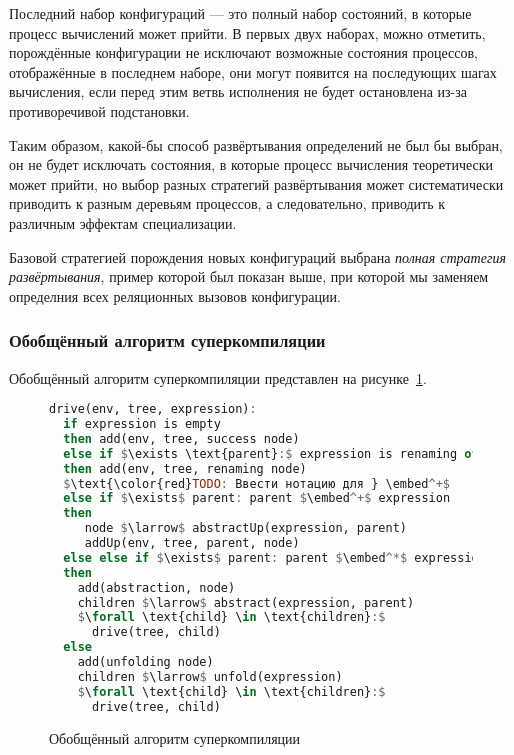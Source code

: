 Последний набор конфигураций --- это полный набор состояний, в которые процесс вычислений может
прийти. В первых двух наборах, можно отметить, порождённые конфигурации не исключают
возможные состояния процессов, отображённые в последнем наборе, они могут появится на последующих шагах вычисления,
если перед этим ветвь исполнения не будет остановлена из-за противоречивой подстановки.

Таким образом, какой-бы способ развёртывания определений не был бы выбран, он не будет
исключать состояния, в которые процесс вычисления теоретически может прийти, но выбор
разных стратегий развёртывания может систематически приводить к разным деревьям процессов,
а следовательно, приводить к различным эффектам специализации.

Базовой стратегией порождения новых конфигураций выбрана \emph{полная стратегия развёртывания},
пример которой был показан выше, при которой мы заменяем определния всех реляционных вызовов
конфигурации.


\subsubsection{Обобщённый алгоритм суперкомпиляции}

Обобщённый алгоритм суперкомпиляции представлен на рисунке~\ref{fig:scalgogen}.

\begin{figure}[h!]
\begin{lstlisting}[mathescape,language=Haskell,extendedchars=\true,frame=single,basicstyle=\ttfamily]
drive(env, tree, expression):
  if expression is empty
  then add(env, tree, success node)
  else if $\exists \text{parent}:$ expression is renaming of parent
  then add(env, tree, renaming node)
  $\text{\color{red}TODO: Ввести нотацию для } \embed^+$
  else if $\exists$ parent: parent $\embed^+$ expression
  then
     node $\larrow$ abstractUp(expression, parent)
     addUp(env, tree, parent, node)
  else else if $\exists$ parent: parent $\embed^*$ expression
  then
    add(abstraction, node)
    children $\larrow$ abstract(expression, parent)
    $\forall \text{child} \in \text{children}:$
      drive(tree, child)
  else
    add(unfolding node)
    children $\larrow$ unfold(expression)
    $\forall \text{child} \in \text{children}:$
      drive(tree, child)
\end{lstlisting}
\caption{Обобщённый алгоритм суперкомпиляции}
\label{fig:scalgogen}
\end{figure}


